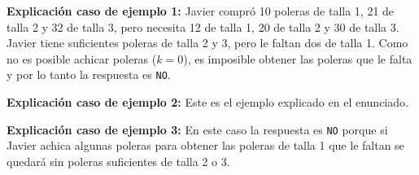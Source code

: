 \documentclass{oci}
\begin{document}
\begin{sampleDescription}
\begin{center}
    \begin{minipage}{0.94\textwidth}
    \textbf{Explicación caso de ejemplo 1:} Javier compró 10 poleras de talla 1, 21 de talla 2 y 32 de talla 3,
    pero necesita 12 de talla 1, 20 de talla 2 y 30 de talla 3.
    Javier tiene suficientes poleras de talla 2 y 3, pero le faltan dos de talla 1.
    Como no es posible achicar poleras ($k=0$), es imposible obtener las poleras que le falta y por
    lo tanto la respuesta es \texttt{NO}.
    \end{minipage}
\end{center}

\begin{center}
    \begin{minipage}{0.94\textwidth}
    \textbf{Explicación caso de ejemplo 2:} Este es el ejemplo explicado en el enunciado.
    \end{minipage}
\end{center}

\begin{center}
    \begin{minipage}{0.94\textwidth}
    \textbf{Explicación caso de ejemplo 3:} En este caso la respuesta es \texttt{NO} porque si Javier
    achica algunas poleras para obtener las poleras de talla 1 que le faltan se quedará sin poleras
    suficientes de talla 2 o 3.
    \end{minipage}
\end{center}
\end{sampleDescription}
\end{document}
